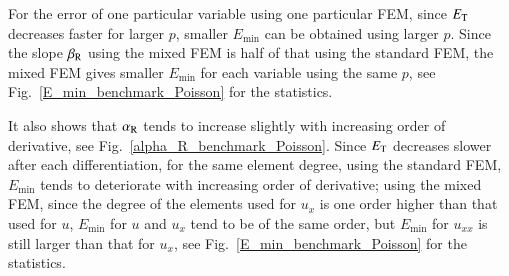\documentclass[review,3p]{elsarticle}
\begin{document}
For the error of one particular variable using one particular FEM, since $E_{\rm T}$ decreases faster for larger $p$, smaller ${E}_{\text{min}}$ can be obtained using larger $p$. Since the slope $\beta_{\rm R}$ using the mixed FEM is half of that using the standard FEM\cite{kahan2013floating}, the mixed FEM gives smaller ${E}_{\text{min}}$ for each variable using the same $p$, see Fig.~\ref{E_min_benchmark_Poisson} for the statistics.

It also shows that $\alpha_{\rm R}$ tends to increase slightly with increasing order of derivative, see Fig.~\ref{alpha_R_benchmark_Poisson}. Since $E_{\rm T}$ decreases slower after each differentiation, for the same element degree, using the standard FEM, ${E}_{\text{min}}$ tends to deteriorate with increasing order of derivative; using the mixed FEM, since the degree of the elements used for $u_{x}$ is one order higher than that used for $u$, ${E}_{\text{min}}$ for $u$ and $u_{x}$ tend to be of the same order, but ${E}_{\text{min}}$ for $u_{xx}$ is still larger than that for $u_{x}$, see Fig.~\ref{E_min_benchmark_Poisson} for the statistics. 
\end{document}
